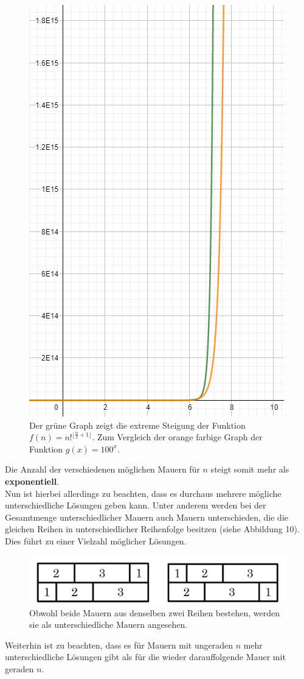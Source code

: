 \documentclass[a4paper,12pt]{article}
\begin{document}
\begin{figure}[H]
    \centering
    \includegraphics[width=0.7\linewidth]{Bilder/Aufgabe1/Graph_03.png}
    \caption{Der grüne Graph zeigt die extreme Steigung der Funktion 
        $f(n) = n!^{\lfloor\frac{n}{2}+1\rfloor}$. Zum Vergleich der orange farbige Graph der Funktion $g(x) = 100^{x}$.}
\end{figure}
Die Anzahl der verschiedenen möglichen Mauern für $n$ steigt somit mehr als 
\textbf{exponentiell}.
\\[0.4cm]
Nun ist hierbei allerdings zu beachten, dass es durchaus mehrere mögliche unterschiedliche Lösungen geben kann. Unter anderem werden bei der Gesamtmenge unterschiedlicher Mauern auch Mauern unterschieden, die die gleichen Reihen in unterschiedlicher Reihenfolge besitzen (siehe Abbildung 10). Dies führt zu einer Vielzahl möglicher Lösungen.
\begin{figure}[H]
    \centering
    \includegraphics[width=0.9\linewidth]{Bilder/Aufgabe1/Mauervarianten_N3.png}
    \caption{Obwohl beide Mauern aus denselben zwei Reihen bestehen, werden sie als unterschiedliche Mauern angesehen.}
\end{figure}
Weiterhin ist zu beachten, dass es für Mauern mit ungeraden $n$ mehr unterschiedliche Lösungen gibt als für die wieder darauffolgende Mauer mit geraden $n$.
\end{document}

